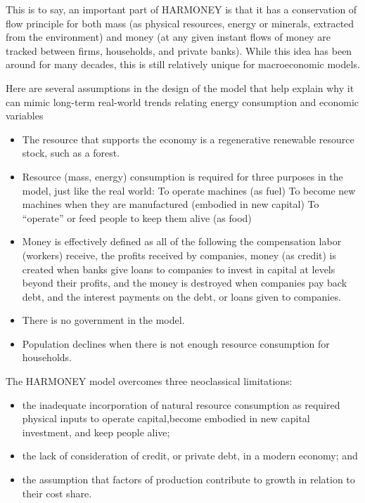 \documentclass[
]{book}
\begin{document}
This is to say, an important part of HARMONEY is that it has a conservation of flow principle for both mass (as physical resources, energy or minerals, extracted from the environment) and money (at any given instant flows of money are tracked between firms, households, and private banks). While this idea has been around for many decades, this is still relatively unique for macroeconomic models.

Here are several assumptions in the design of the model that help explain why it can mimic long-term real-world trends relating energy consumption and economic variables

\begin{itemize}
\item
  The resource that supports the economy is a regenerative renewable resource stock, such as a forest.
\item
  Resource (mass, energy) consumption is required for three purposes in the model, just like the real world:
  To operate machines (as fuel)
  To become new machines when they are manufactured (embodied in new capital)
  To ``operate'' or feed people to keep them alive (as food)
\item
  Money is effectively defined as all of the following
  the compensation labor (workers) receive,
  the profits received by companies,
  money (as credit) is created when banks give loans to companies to invest in capital at levels beyond their profits, and the money is destroyed when companies pay back debt, and
  the interest payments on the debt, or loans given to companies.
\item
  There is no government in the model.
\item
  Population declines when there is not enough resource consumption for households.
\end{itemize}

The HARMONEY model overcomes three neoclassical limitations:

\begin{itemize}
\item
  the inadequate incorporation of natural resource consumption as
  required physical inputs to operate capital,become embodied in new capital investment, and keep people alive;
\item
  the lack of consideration of credit, or private debt, in a modern economy; and
\item
  the assumption that factors of production contribute to growth in
  relation to their cost share.
\end{itemize}
\end{document}
